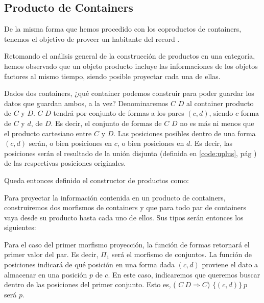 \begin{agdacode}\hspace{3ex}\label{cod:setHasProducts}
  
\end{agdacode}


\subsection{Producto de Containers}
De la misma forma que hemos procedido con los coproductos de containers, tenemos el objetivo de proveer un habitante del record  \AgdaFunction{$\Cont$}.

Retomando el análisis general de la construcción de productos en una categoría, hemos observado que un objeto producto incluye las informaciones de los objetos factores al mismo tiempo, siendo posible proyectar cada una de ellas. 

Dados dos containers, ¿qué container podemos construir para poder guardar los datos que guardan ambos, a la vez?
Denominaremos  $C$ $D$ al container producto de $C$ y $D$.
 $C$ $D$ tendrá por conjunto de formas a los pares $(c,d)$, siendo $c$ forma de $C$ y $d$, de $D$. Es decir, el conjunto de formas de  $C$ $D$ no es más ni menos que el producto cartesiano entre \Sh $C$ y \Sh $D$.
Las posiciones posibles dentro de una forma $(c,d)$ serán, o bien posiciones en $c$, o bien posiciones en $d$. Es decir, las posiciones serán el resultado de la unión disjunta (definida en \ref{code:uplus}, pág \pageref{code:dext}) de las respectivas posiciones originales. 

Queda entonces definido el constructor de productos  como:


Para proyectar la información contenida en un producto de containers, construiremos dos morfismos de containers  y  que para todo par de containers  vaya desde su producto hasta cada uno de ellos. Sus tipos serán entonces los siguientes:


Para el caso del primer morfismo proyección, la función de formas retornará el primer valor del par. Es decir, \mSh $\Pi_1$ será el morfismo  de conjuntos.
La función de posiciones indicará de qué posición en una forma dada $(c,d)$ proviene el dato a almacenar en una posición $p$ de $c$. En este caso, indicaremos que queremos buscar dentro de las posiciones del primer conjunto. Esto es, \mPos ( $C\ D \Rightarrow C$) $\{(c,d)\}\ p$  será  $p$.


